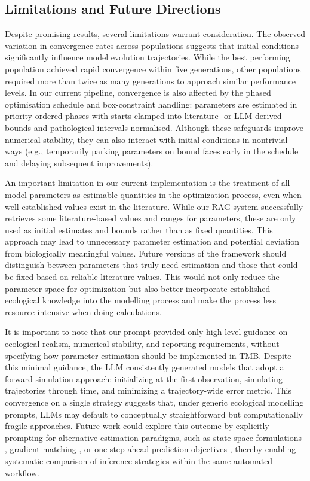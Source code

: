 \subsection{Limitations and Future Directions}

Despite promising results, several limitations warrant consideration. The observed variation in convergence rates across populations suggests that initial conditions significantly influence model evolution trajectories. While the best performing population achieved rapid convergence within five generations, other populations required more than twice as many generations to approach similar performance levels. In our current pipeline, convergence is also affected by the phased optimisation schedule and box-constraint handling: parameters are estimated in priority-ordered phases with starts clamped into literature- or LLM-derived bounds and pathological intervals normalised. Although these safeguards improve numerical stability, they can also interact with initial conditions in nontrivial ways (e.g., temporarily parking parameters on bound faces early in the schedule and delaying subsequent improvements).

An important limitation in our current implementation is the treatment of all model parameters as estimable quantities in the optimization process, even when well-established values exist in the literature. While our RAG system successfully retrieves some literature-based values and ranges for parameters, these are only used as initial estimates and bounds rather than as fixed quantities. This approach may lead to unnecessary parameter estimation and potential deviation from biologically meaningful values. Future versions of the framework should distinguish between parameters that truly need estimation and those that could be fixed based on reliable literature values. This would not only reduce the parameter space for optimization but also better incorporate established ecological knowledge into the modelling process and make the process less resource-intensive when doing calculations.

It is important to note that our prompt provided only high-level guidance on ecological realism, numerical stability, and reporting requirements, without specifying how parameter estimation should be implemented in TMB. Despite this minimal guidance, the LLM consistently generated models that adopt a forward-simulation approach: initializing at the first observation, simulating trajectories through time, and minimizing a trajectory-wide error metric. This convergence on a single strategy suggests that, under generic ecological modelling prompts, LLMs may default to conceptually straightforward but computationally fragile approaches. Future work could explore this outcome by explicitly prompting for alternative estimation paradigms, such as state-space formulations \citep{auger2021guide}, gradient matching \citep{ellner2002fitting}, or one-step-ahead prediction objectives \citep{munch2023recent}, thereby enabling systematic comparison of inference strategies within the same automated workflow.

